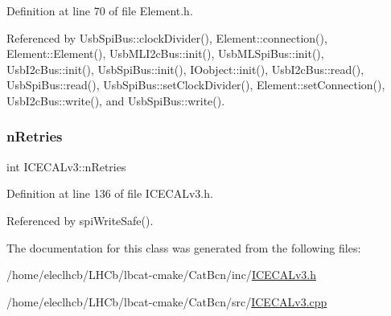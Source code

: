 Definition at line 70 of file Element.\+h.



Referenced by Usb\+Spi\+Bus\+::clock\+Divider(), Element\+::connection(), Element\+::\+Element(), Usb\+M\+L\+I2c\+Bus\+::init(), Usb\+M\+L\+Spi\+Bus\+::init(), Usb\+I2c\+Bus\+::init(), Usb\+Spi\+Bus\+::init(), I\+Oobject\+::init(), Usb\+I2c\+Bus\+::read(), Usb\+Spi\+Bus\+::read(), Usb\+Spi\+Bus\+::set\+Clock\+Divider(), Element\+::set\+Connection(), Usb\+I2c\+Bus\+::write(), and Usb\+Spi\+Bus\+::write().

\mbox{\label{classICECALv3_ae877ce34b3a4d6c368cc6409ac9614fa}} 
\subsubsection{\texorpdfstring{n\+Retries}{nRetries}}
{\footnotesize\ttfamily int I\+C\+E\+C\+A\+Lv3\+::n\+Retries\hspace{0.3cm}{\ttfamily [private]}}



Definition at line 136 of file I\+C\+E\+C\+A\+Lv3.\+h.



Referenced by spi\+Write\+Safe().



The documentation for this class was generated from the following files\+:\begin{DoxyCompactItemize}
\item 
/home/eleclhcb/\+L\+H\+Cb/lbcat-\/cmake/\+Cat\+Bcn/inc/\hyperlink{ICECALv3_8h}{I\+C\+E\+C\+A\+Lv3.\+h}\item 
/home/eleclhcb/\+L\+H\+Cb/lbcat-\/cmake/\+Cat\+Bcn/src/\hyperlink{ICECALv3_8cpp}{I\+C\+E\+C\+A\+Lv3.\+cpp}\end{DoxyCompactItemize}
